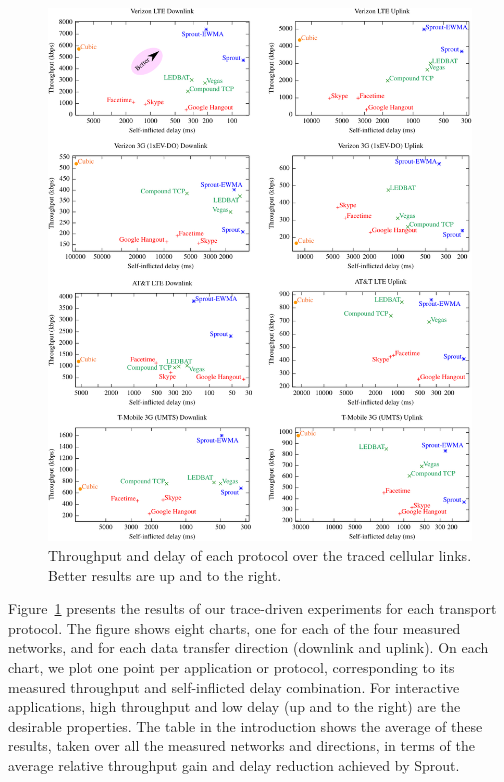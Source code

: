 \begin{figure}
\caption{Throughput and delay of each protocol over the traced
  cellular links. Better results are up and to the right.}

\vspace{\baselineskip}
\begin{centering}
\noindent\includegraphics[width=\textwidth]{graphs-out.pdf}

\end{centering}

\label{f:allgraphs}

\end{figure}

Figure~\ref{f:allgraphs} presents the results of our trace-driven
experiments for each transport protocol. The figure shows eight
charts, one for each of the four measured networks, and for each data
transfer direction (downlink and uplink). On each chart, we plot one
point per application or protocol, corresponding to its measured
throughput and self-inflicted delay combination. For interactive
applications, high throughput and low delay (up and to the right) are
the desirable properties. The table in the introduction shows the
average of these results, taken over all the measured networks and
directions, in terms of the average relative throughput gain and delay
reduction achieved by Sprout.

